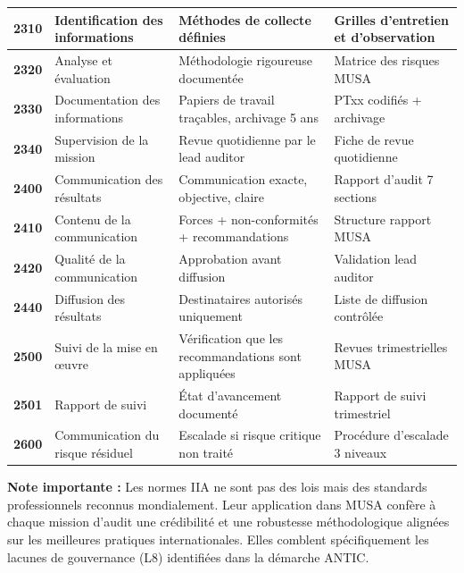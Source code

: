\documentclass[12pt,a4paper,oneside]{report}
\begin{document}
\begin{longtable}{|p{2cm}|p{4cm}|p{4cm}|p{3cm}|}
\hline\rowcolor{trow1}
\textbf{2310} &
  Identification des informations &
  Méthodes de collecte définies &
  Grilles d'entretien et d'observation \\
\hline\rowcolor{trow2}
\textbf{2320} &
  Analyse et évaluation &
  Méthodologie rigoureuse documentée &
  Matrice des risques MUSA \\
\hline\rowcolor{trow1}
\textbf{2330} &
  Documentation des informations &
  Papiers de travail traçables, archivage 5 ans &
  PTxx codifiés + archivage \\
\hline\rowcolor{trow2}
\textbf{2340} &
  Supervision de la mission &
  Revue quotidienne par le lead auditor &
  Fiche de revue quotidienne \\
\hline\rowcolor{trow1}
\textbf{2400} &
  Communication des résultats &
  Communication exacte, objective, claire &
  Rapport d'audit 7 sections \\
\hline\rowcolor{trow2}
\textbf{2410} &
  Contenu de la communication &
  Forces + non-conformités + recommandations &
  Structure rapport MUSA \\
\hline\rowcolor{trow1}
\textbf{2420} &
  Qualité de la communication &
  Approbation avant diffusion &
  Validation lead auditor \\
\hline\rowcolor{trow2}
\textbf{2440} &
  Diffusion des résultats &
  Destinataires autorisés uniquement &
  Liste de diffusion contrôlée \\
\hline\rowcolor{trow1}
\textbf{2500} &
  Suivi de la mise en œuvre &
  Vérification que les recommandations sont appliquées &
  Revues trimestrielles MUSA \\
\hline\rowcolor{trow2}
\textbf{2501} &
  Rapport de suivi &
  État d'avancement documenté &
  Rapport de suivi trimestriel \\
\hline\rowcolor{trow1}
\textbf{2600} &
  Communication du risque résiduel &
  Escalade si risque critique non traité &
  Procédure d'escalade 3 niveaux \\
\hline
\end{longtable}

\vspace{0.5cm}
\begin{encadre}
\textbf{Note importante :} Les normes IIA ne sont pas des lois mais des standards
professionnels reconnus mondialement. Leur application dans MUSA confère à chaque
mission d'audit une crédibilité et une robustesse méthodologique alignées sur les
meilleures pratiques internationales. Elles comblent spécifiquement les lacunes de
gouvernance (L8) identifiées dans la démarche ANTIC.
\end{encadre}
\end{document}
